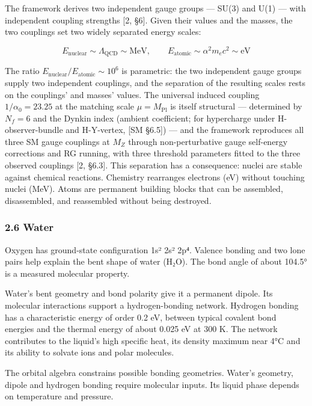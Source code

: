 \documentclass[
]{article}
\begin{document}
The framework derives two independent gauge groups --- SU(3) and U(1)
--- with independent coupling strengths {[}2, §6{]}. Given their values
and the masses, the two couplings set two widely separated energy
scales:

\[E_{\text{nuclear}} \sim \Lambda_{\text{QCD}} \sim \text{MeV}, \qquad E_{\text{atomic}} \sim \alpha^2 m_e c^2 \sim \text{eV}\]

The ratio \(E_{\text{nuclear}} / E_{\text{atomic}} \sim 10^6\) is
parametric: the two independent gauge groups supply two independent
couplings, and the separation of the resulting scales rests on the
couplings' and masses' values. The universal induced coupling
\(1/\alpha_0 = 23.25\) at the matching scale \(\mu = M_{\text{Pl}}\) is
itself structural --- determined by \(N_f = 6\) and the Dynkin index
(ambient coefficient; for hypercharge under H-observer-bundle and
H-Y-vertex, {[}SM §6.5{]}) --- and the framework reproduces all three SM
gauge couplings at \(M_Z\) through non-perturbative gauge self-energy
corrections and RG running, with three threshold parameters fitted to
the three observed couplings {[}2, §6.3{]}. This separation has a
consequence: nuclei are stable against chemical reactions. Chemistry
rearranges electrons (eV) without touching nuclei (MeV). Atoms are
permanent building blocks that can be assembled, disassembled, and
reassembled without being destroyed.

\hypertarget{water}{%
\subsubsection{2.6 Water}\label{water}}

Oxygen has ground-state configuration 1s² 2s² 2p⁴. Valence bonding and
two lone pairs help explain the bent shape of water (H₂O). The bond
angle of about 104.5° is a measured molecular property.

Water's bent geometry and bond polarity give it a permanent dipole. Its
molecular interactions support a hydrogen-bonding network. Hydrogen
bonding has a characteristic energy of order 0.2 eV, between typical
covalent bond energies and the thermal energy of about 0.025 eV at 300
K. The network contributes to the liquid's high specific heat, its
density maximum near 4°C and its ability to solvate ions and polar
molecules.

The orbital algebra constrains possible bonding geometries. Water's
geometry, dipole and hydrogen bonding require molecular inputs. Its
liquid phase depends on temperature and pressure.
\end{document}

